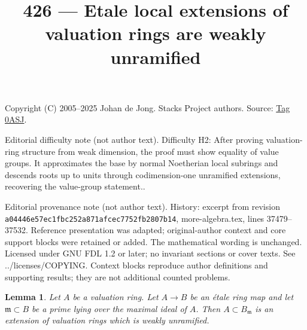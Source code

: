 \documentclass{amsart}
\theoremstyle{plain}
\newtheorem{lemma}[subsection]{Lemma}
\theoremstyle{definition}
\theoremstyle{remark}
\numberwithin{equation}{subsection}
\begin{document}
\title[Stacks Project, Tag 0ASJ]{426 --- Etale local extensions of valuation rings are weakly unramified}
\maketitle
\noindent Copyright (C) 2005--2025 Johan de Jong. Stacks Project authors. Source: \href{https://stacks.math.columbia.edu/tag/0ASJ}{Tag 0ASJ}.

\noindent Editorial difficulty note (not author text). Difficulty H2: After proving valuation-ring structure from weak dimension, the proof must show equality of value groups. It approximates the base by normal Noetherian local subrings and descends roots up to units through codimension-one unramified extensions, recovering the value-group statement..

\noindent Editorial provenance note (not author text). History: excerpt from revision \texttt{a0444\allowbreak 6e57e\allowbreak c1fbc\allowbreak 252a8\allowbreak 71afc\allowbreak ec775\allowbreak 2fb28\allowbreak 07b14}, more-algebra.tex, lines 37479--37532. Reference presentation was adapted; original-author context and core support blocks were retained or added. The mathematical wording is unchanged. Licensed under GNU FDL 1.2 or later; no invariant sections or cover texts. See ../licenses/COPYING. Context blocks reproduce author definitions and supporting results; they are not additional counted problems.

\begin{lemma}
\label{lemma-etale-extension-valuation-ring}
Let $A$ be a valuation ring. Let $A \to B$ be an \'etale ring map
and let $\mathfrak m \subset B$ be a prime lying over the maximal
ideal of $A$. Then $A \subset B_\mathfrak m$ is an extension of
valuation rings which is weakly unramified.
\end{lemma}
\end{document}
